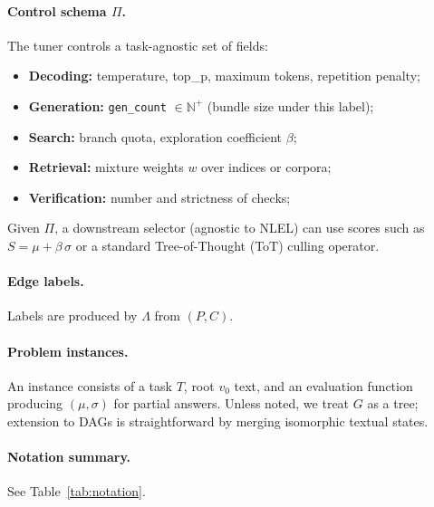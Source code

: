 \documentclass{article}
\theoremstyle{plain}
\theoremstyle{definition}
\theoremstyle{remark}
\begin{document}
\paragraph{Control schema $\Pi$.}
The tuner controls a task-agnostic set of fields:
\begin{itemize}
  \item \textbf{Decoding:} temperature, top\_p, maximum tokens, repetition penalty;
  \item \textbf{Generation:} \texttt{gen\_count} $\in \mathbb{N}^{+}$ (bundle size under this label);
  \item \textbf{Search:} branch quota, exploration coefficient $\beta$;
  \item \textbf{Retrieval:} mixture weights $w$ over indices or corpora;
  \item \textbf{Verification:} number and strictness of checks;
\end{itemize}
Given $\Pi$, a downstream selector (agnostic to NLEL) can use scores such as $S=\mu+\beta\,\sigma$ or a standard Tree-of-Thought (ToT) culling operator.

\paragraph{Edge labels.}
Labels are produced by $\Lambda$ from $(P,C)$.

\paragraph{Problem instances.}
An instance consists of a task $T$, root $v_0$ text, and an evaluation function producing $(\mu,\sigma)$ for partial answers.
Unless noted, we treat $G$ as a tree; extension to DAGs is straightforward by merging isomorphic textual states.

\paragraph{Notation summary.}
See Table~\ref{tab:notation}.
\end{document}
